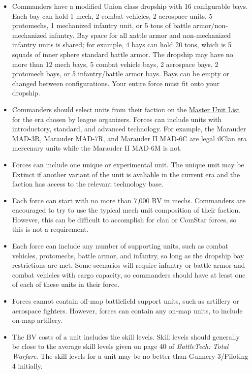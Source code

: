 \documentclass{article}
\begin{document}
\begin{itemize}

\item Commanders have a modified Union class dropship with 16 configurable bays.
Each bay can hold 1 mech, 2 combat vehicles, 2 aerospace units, 5 protomechs, 1 mechanized infantry unit, or 5 tons of battle armor/non-mechanized infantry.
Bay space for all xattle armor and non-mechanized infantry units is shared; for example, 4 bays can hold 20 tons, which is 5 squads of inner sphere standard battle armor.
The dropship may have no more than 12 mech bays, 5 combat vehicle bays, 2 aerospace bays, 2 protomech bays, or 5 infantry/battle armor bays.
Bays can be empty or changed between configurations.
Your entire force must fit onto your dropship.

\item Commanders should select units from their faction on the \href{http://www.masterunitlist.info/}{Master Unit List} for the era chosen by league organizers.
Forces can include units with introductory, standard, and advanced technology.
For example, the Marauder MAD-3R, Marauder MAD-7R, and Marauder II MAD-6C are legal ilClan era mercenary units while the Marauder II MAD-6M is not.

\item Forces can include one unique or experimental unit.
The unique unit may be Extinct if another variant of the unit is avaliable in the current era and the faction has access to the relevant technology base.

\item Each force can start with no more than 7,000 BV in mechs.
Commanders are encouraged to try to use the typical mech unit composition of their faction.
However, this can be difficult to accomplish for clan or ComStar forces, so this is not a requirement.

\item Each force can include any number of supporting units, such as combat vehicles, protomechs, battle armor, and infantry, so long as the dropship bay restrictions are met.
Some scenarios will require infantry or battle armor and combat vehicles with cargo capacity, so commanders should have at least one of each of these units in their force.

\item Forces cannot contain off-map battlefield support units, such as artillery or aerospace fighters.
However, forces can contain any on-map units, to include on-map artillery.

\item The BV costs of a unit includes the skill levels.
Skill levels should generally be close to the average skill levels given on page 40 of \emph{BattleTech: Total Warfare}.
The skill levels for a unit may be no better than Gunnery 3/Piloting 4 initially.

\end{itemize}
\end{document}
